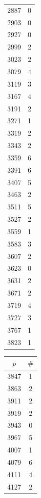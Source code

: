 \documentclass[10pt,a4paper]{amsart}
\begin{document}
\begin{table}[htbp]
\begin{minipage}{0.135\textwidth}
\begin{tabular}{c|c}
        2887 & 0 \\
        2903 & 0 \\
        2927 & 0 \\
        2999 & 2 \\
        3023 & 2 \\
        3079 & 4 \\
        3119 & 3 \\
        3167 & 4 \\
        3191 & 2 \\
        3271 & 1 \\
        3319 & 2 \\
        3343 & 2 \\
        3359 & 6 \\
        3391 & 6 \\
        3407 & 5 \\
        3463 & 2 \\
        3511 & 5 \\
        3527 & 2 \\
        3559 & 1 \\
        3583 & 3 \\
        3607 & 2 \\
        3623 & 0 \\
        3631 & 2 \\
        3671 & 2 \\
        3719 & 4 \\
        3727 & 3 \\
        3767 & 1 \\
        3823 & 1
    \end{tabular}
\end{minipage}\hspace{-2mm}
%
\begin{minipage}{0.135\textwidth}
    \centering
    \begin{tabular}{c|c}
        $p$ & $\#$ \\ \hline
        3847 & 1 \\
        3863 & 2 \\
        3911 & 2 \\
        3919 & 2 \\
        3943 & 0 \\
        3967 & 5 \\
        4007 & 1 \\
        4079 & 6 \\
        4111 & 4 \\
        4127 & 2 \\

\end{tabular}
\end{minipage}
\end{table}
\end{document}

